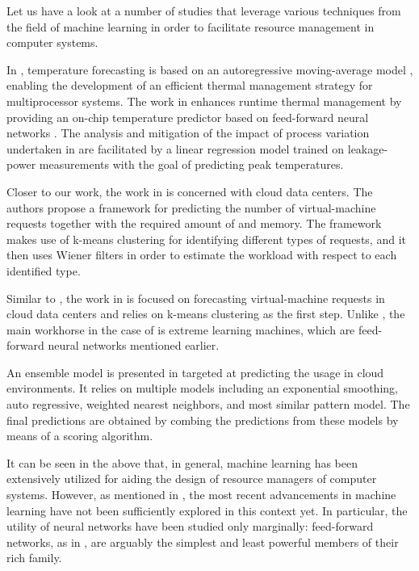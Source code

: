 Let us have a look at a number of studies that leverage various techniques from
the field of machine learning in order to facilitate resource management in
computer systems.

In \cite{coskun2008}, temperature forecasting is based on an autoregressive
moving-average model \cite{hastie2009}, enabling the development of an efficient
thermal management strategy for multiprocessor systems. The work in
\cite{kumar2010} enhances runtime thermal management by providing an on-chip
temperature predictor based on feed-forward neural networks \cite{hastie2009}.
The analysis and mitigation of the impact of process variation undertaken in
\cite{juan2014} are facilitated by a linear regression model \cite{hastie2009}
trained on leakage-power measurements with the goal of predicting peak
temperatures.

Closer to our work, the work in \cite{dabbagh2015} is concerned with cloud data
centers. The authors propose a framework for predicting the number of
virtual-machine requests together with the required amount of  and
memory. The framework makes use of k-means clustering \cite{hastie2009} for
identifying different types of requests, and it then uses Wiener filters in
order to estimate the workload with respect to each identified type.

Similar to \cite{dabbagh2015}, the work in \cite{ismaeel2015} is focused on
forecasting virtual-machine requests in cloud data centers and relies on k-means
clustering as the first step. Unlike \cite{dabbagh2015}, the main workhorse in
the case of \cite{ismaeel2015} is extreme learning machines, which are
feed-forward neural networks mentioned earlier.

An ensemble model \cite{hastie2009} is presented in \cite{cao2014} targeted at
predicting the  usage in cloud environments. It relies on multiple
models including an exponential smoothing, auto regressive, weighted nearest
neighbors, and most similar pattern model. The final predictions are obtained by
combing the predictions from these models by means of a scoring algorithm.

It can be seen in the above that, in general, machine learning has been
extensively utilized for aiding the design of resource managers of computer
systems. However, as mentioned in , the most recent
advancements in machine learning have not been sufficiently explored in this
context yet. In particular, the utility of neural networks have been studied
only marginally: feed-forward networks, as in \cite{kumar2010, ismaeel2015}, are
arguably the simplest and least powerful members of their rich family.

